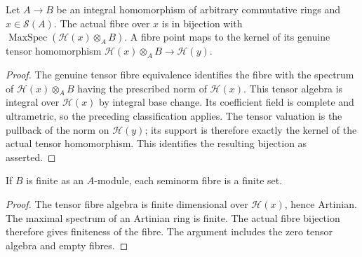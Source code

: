 \begin{theorem}
\label{spectrum:integral-completed-fibres}
\leanok
{}
Let $A\to B$ be an integral homomorphism of arbitrary commutative
rings and $x\in\mathcal S(A)$. The actual fibre over $x$ is in
bijection with $\operatorname{MaxSpec}(\mathcal H(x)\otimes_A B)$.
A fibre point maps to the kernel of its genuine tensor
homomorphism $\mathcal H(x)\otimes_A B\to\mathcal H(y)$.
\end{theorem}
\begin{proof}
The genuine tensor fibre equivalence identifies the fibre with the
spectrum of $\mathcal H(x)\otimes_A B$ having the prescribed norm
of $\mathcal H(x)$. This tensor algebra is integral over
$\mathcal H(x)$ by integral base change. Its coefficient field is
complete and ultrametric, so the preceding classification applies.
The tensor valuation is the pullback of the norm on $\mathcal H(y)$;
its support is therefore exactly the kernel of the actual tensor
homomorphism. This identifies the resulting bijection as asserted.
\end{proof}

\begin{corollary}
\label{spectrum:finite-completed-fibres}
\leanok
{}
If $B$ is finite as an $A$-module, each seminorm fibre is a finite set.
\end{corollary}
\begin{proof}
The tensor fibre algebra is finite dimensional over $\mathcal H(x)$,
hence Artinian. The maximal spectrum of an Artinian ring is finite.
The actual fibre bijection therefore gives finiteness of the fibre.
The argument includes the zero tensor algebra and empty fibres.
\end{proof}

